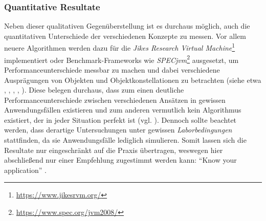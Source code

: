 

\subsubsection*{Quantitative Resultate}
Neben dieser qualitativen Gegenüberstellung ist es durchaus möglich, auch die quantitativen Unterschiede der verschiedenen Konzepte zu messen.
Vor allem neuere Algorithmen werden dazu für die \textit{Jikes Research Virtual Machine}\footnote{\url{https://www.jikesrvm.org/}} implementiert oder Benchmark-Frameworks wie \textit{SPECjvm}\footnote{\url{https://www.spec.org/jvm2008/}} ausgesetzt, um Performanceunterschiede messbar zu machen und dabei verschiedene Ausprägungen von Objekten und Objektkonstellationen zu betrachten (siehe etwa \cite{blackburn2003}, \cite{blackburn2004}, \cite{kermany2006}, \cite{levanoni2006}, \cite{garner2007}).
Diese belegen durchaus, dass zum einen deutliche Performanceunterschiede zwischen verschiedenen Ansätzen in gewissen Anwendungsfällen existieren und zum anderen vermutlich kein Algorithmus existiert, der in jeder Situation perfekt ist (vgl. \cite{fitzgerald2000}).
Dennoch sollte beachtet werden, dass derartige Untersuchungen unter gewissen \textit{Laborbedingungen} stattfinden, da sie Anwendungsfälle lediglich simulieren.
Somit lassen sich die Resultate nur eingeschränkt auf die Praxis übertragen, weswegen hier abschließend nur einer Empfehlung zugestimmt werden kann: \enquote{Know your application} \cite[S. 80]{handbook}.
